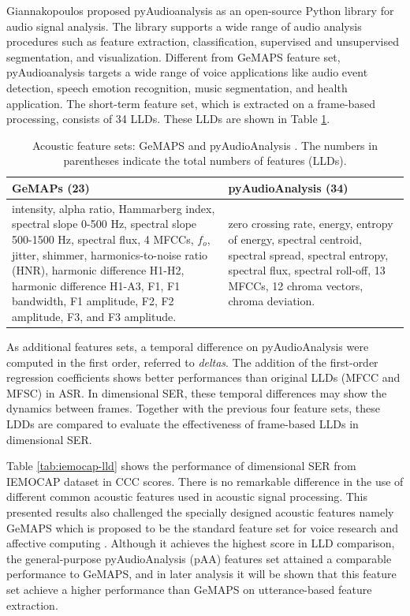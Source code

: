Giannakopoulos \cite{Giannakopoulos2015} proposed pyAudioanalysis as an
open-source Python library for audio signal analysis. The library supports a
wide range of audio analysis procedures such as feature extraction,
classification, supervised and unsupervised segmentation, and visualization.
Different from GeMAPS feature set, pyAudioanalysis targets a wide range of
voice applications like audio event detection, speech emotion recognition,
music segmentation, and health application. The short-term feature set, which
is extracted on a frame-based processing, consists of 34 LLDs. These LLDs are
shown in Table \ref{tab:gemaps_paa}.

\begin{table}[htpb]
\caption{Acoustic feature sets: GeMAPS \cite{Eyben} and pyAudioAnalysis
\cite{Giannakopoulos2015}. The numbers in parentheses indicate the total
numbers of features (LLDs).}
\label{tab:gemaps_paa}
  \begin{center}
\begin{tabular}{p{7.5cm} | p{7cm}}
  \hline 
\hspace{2.5cm}GeMAPs (23) & \hspace{1.5cm}pyAudioAnalysis (34) \\
\hline \hline
intensity, alpha ratio, Hammarberg index, spectral slope 0-500 Hz, spectral
slope 500-1500 Hz, spectral flux, 4 MFCCs, $f_o$, jitter, shimmer,
harmonics-to-noise ratio (HNR), harmonic difference H1-H2, harmonic difference
H1-A3, F1, F1 bandwidth, F1 amplitude, F2, F2 amplitude, F3, and F3 amplitude.
& zero crossing rate, energy, entropy of energy, spectral centroid, spectral
spread, spectral entropy, spectral flux, spectral roll-off, 13 MFCCs, 12 chroma
vectors, chroma deviation.\\
  \hline 
  \end{tabular}
\end{center}
 \end{table}

As additional features sets, a temporal difference on pyAudioAnalysis were
computed in the first order, referred to \emph{deltas}. The addition of the
first-order regression coefficients shows better performances than original LLDs
(MFCC and MFSC) in ASR. In dimensional SER, these temporal differences may show
the dynamics between frames. Together with the previous four feature sets,
these LDDs are compared to evaluate the effectiveness of frame-based LLDs in
dimensional SER. 

Table \ref{tab:iemocap-lld} shows the performance of dimensional SER from
IEMOCAP dataset in CCC scores. There is no remarkable difference in the use of
different common acoustic features used in acoustic signal processing. This
presented results also challenged the specially designed acoustic features
namely GeMAPS \cite{Busso2008} which is proposed to be the standard feature set
for voice research and affective computing \cite{Eyben}. Although it achieves
the highest score in LLD comparison, the general-purpose pyAudioAnalysis (pAA)
features set attained a comparable performance to GeMAPS, and in later analysis
it will be shown that this feature set achieve a higher performance than GeMAPS
on utterance-based feature extraction. 

